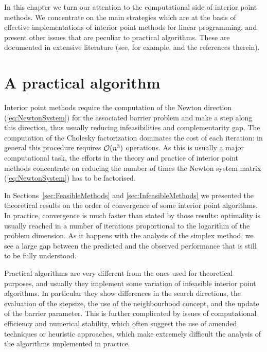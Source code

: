 
%
%
\label{ch:PracticalIpm}

In this chapter we turn our attention to the computational side of
interior point methods. We concentrate on the main strategies which are
at the basis of effective implementations of interior point methods
for linear programming, and present other issues that are peculiar 
to practical algorithms.
These are documented in extensive literature (see, for example, 
\cite{AndersenGondzioMeszarosXu,GondzioTerlaky,ipm:Wright97} 
and the references therein).


%
%
\section{A practical algorithm}

Interior point methods require the computation of the Newton 
direction (\ref{eq:NewtonSystem})
for the associated barrier problem and make a step along 
this direction, thus usually reducing infeasibilities 
and complementarity gap.
The computation of the Cholesky factorization
dominates the cost of each iteration: in general this procedure
requires $\mathcal{O}(n^3)$ operations.
As this is usually a major computational task, 
the efforts in the theory and practice of 
interior point methods concentrate on reducing 
the number of times the Newton system matrix (\ref{eq:NewtonSystem}) 
has to be factorised.

In Sections~\ref{sec:FeasibleMethods} and \ref{sec:InfeasibleMethods}
we presented the theoretical
results on the order of convergence of some interior point algorithms.
In practice, convergence is much faster than stated by those results:
optimality is usually reached in a number of iterations 
proportional to the logarithm of the problem dimension. 
As it happens with the analysis of the simplex method, we see a large
gap between the predicted and the observed performance that is still to
be fully understood.


Practical algorithms are very different from the ones used for
theoretical purposes, and usually they implement some variation
of infeasible interior point algorithms. In particular they show
differences in the search directions, the evaluation of the stepsize, 
the use of the neighbourhood concept, and the update of the
barrier parameter.
This is further complicated by issues of computational efficiency
and numerical stability, which often suggest the use of amended
techniques or heuristic approaches, which make extremely difficult 
the analysis of the algorithms implemented in practice.

